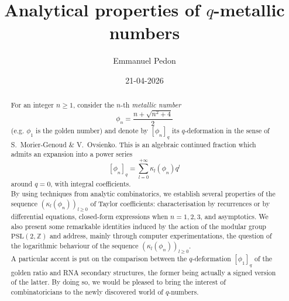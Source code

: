 \documentclass[11pt,reqno]{amsart}
\theoremstyle{plain}
\theoremstyle{definition}
\numberwithin{figure}{section}
\numberwithin{table}{section}
\numberwithin{equation}{section}
\newcommand{\Z}{\mathbb{Z}}
\newcommand{\PSL}{\mathrm{PSL}}
\begin{document}
\title[Analytical properties of $q$-metallic numbers]
{Analytical properties of $q$-metallic numbers}
\author{Emmanuel Pedon}
\address{Emmanuel Pedon,
Universit\'e de Reims Champagne-Ardenne,
CNRS, LMR, UMR~9008, Reims, France} 
\date{21-04-2026}


\begin{abstract}
For an integer $n≥1$,  consider the $n$-th \emph{metallic number} 
$$\phi_n=\frac{n+\sqrt{n^2+4}}{2}$$
(e.g. $\phi_1$ is the golden number) and denote by $[\phi_n]_q$  its $q$-deformation in the sense of S.~Morier-Genoud \& V.~Ovsienko. This is an algebraic continued fraction which admits an expansion into a power series $$[\phi_n]_q =\sum_{l=0}^{+\infty} \kappa_l(\phi_n) q^l$$ around $q=0$, with integral coefficients.\\
By using  techniques from analytic combinatorics, we establish  several properties of the sequence $( \kappa_l(\phi_n))_{l≥0}$ of Taylor coefficients:  characterisation by recurrences or by differential equations, closed-form expressions when $n=1,2,3$,  and asymptotics. We also present some remarkable identities induced by the action of the modular group $\PSL(2,\Z)$ and address,  mainly through computer experimentations, the question of the logarithmic behaviour of the sequence $( \kappa_l(\phi_n))_{l≥0}$. \\
A particular accent is put on the comparison between the $q$-deformation $[\phi_1]_q$ of the golden ratio and RNA secondary structures, the former being actually a signed version of the latter. By doing so, we would be pleased to bring the interest of combinatoricians to the newly discovered world of $q$-numbers.
\end{abstract}

\maketitle
\thispagestyle{empty}
















\end{document}
